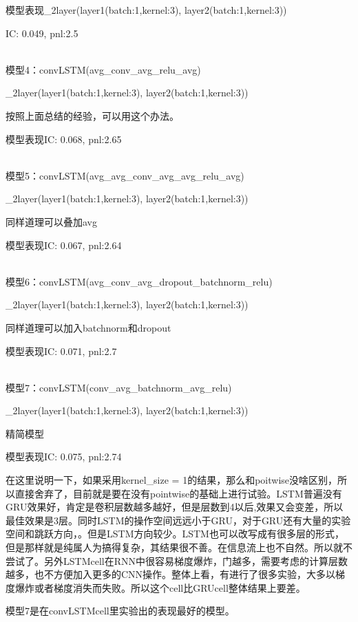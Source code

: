 \documentclass[11pt]{ctexart}
\begin{document}
模型表现\_2layer(layer1(batch:1,kernel:3), layer2(batch:1,kernel:3))

{\kaishu \small IC: 0.049, pnl:2.5}

~\\
模型4：convLSTM(avg\_conv\_avg\_relu\_avg)

\_2layer(layer1(batch:1,kernel:3), layer2(batch:1,kernel:3))

按照上面总结的经验，可以用这个办法。

模型表现{\kaishu \small IC: 0.068, pnl:2.65}

~\\
模型5：convLSTM(avg\_avg\_conv\_avg\_avg\_relu\_avg)

\_2layer(layer1(batch:1,kernel:3), layer2(batch:1,kernel:3))

同样道理可以叠加avg

模型表现{\kaishu \small IC: 0.067, pnl:2.64}

~\\
模型6：convLSTM(avg\_conv\_avg\_dropout\_batchnorm\_relu)

\_2layer(layer1(batch:1,kernel:3), layer2(batch:1,kernel:3))

同样道理可以加入batchnorm和dropout

模型表现{\kaishu \small IC: 0.071, pnl:2.7}

~\\
模型7：convLSTM(conv\_avg\_batchnorm\_avg\_relu)

\_2layer(layer1(batch:1,kernel:3), layer2(batch:1,kernel:3))

精简模型

模型表现{\kaishu \small IC: 0.075, pnl:2.74}

在这里说明一下，如果采用kernel\_size = 1的结果，那么和poitwise没啥区别，所以直接舍弃了，目前就是要在没有pointwise的基础上进行试验。LSTM普遍没有GRU效果好，肯定是卷积层数越多越好，但是层数到4以后,效果又会变差，所以最佳效果是3层。同时LSTM的操作空间远远小于GRU，对于GRU还有大量的实验空间和跳跃方向，。但是LSTM方向较少。LSTM也可以改写成有很多层的形式，但是那样就是纯属人为搞得复杂，其结果很不善。在信息流上也不自然。所以就不尝试了。另外LSTMcell在RNN中很容易梯度爆炸，门越多，需要考虑的计算层数越多，也不方便加入更多的CNN操作。整体上看，有进行了很多实验，大多以梯度爆炸或者梯度消失而失败。所以这个cell比GRUcell整体结果上要差。

模型7是在convLSTMcell里实验出的表现最好的模型。
\end{document}
